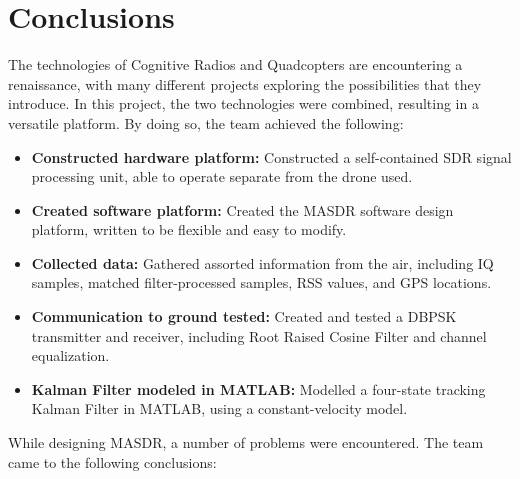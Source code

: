 \chapter{Conclusions}
The technologies of Cognitive Radios and Quadcopters are encountering a renaissance,
with many different projects exploring the possibilities that they introduce. In this project,
the two technologies were combined, resulting in a versatile platform. By doing so, 
the team achieved the following:
\begin{itemize} 
 \item \textbf{Constructed hardware platform: }Constructed a self-contained SDR signal processing
                unit, able to operate separate from the drone used.
 \item \textbf{Created software platform: }Created the MASDR software design platform,
                written to be flexible and easy to modify. 
 \item \textbf{Collected data: }Gathered assorted information from the air, including 
                IQ samples, matched filter-processed samples, RSS values, and GPS locations.
 \item \textbf{Communication to ground tested: }Created and tested a DBPSK transmitter and receiver, 
                including Root Raised Cosine Filter and channel equalization. 
 \item \textbf{Kalman Filter modeled in MATLAB: }Modelled a four-state tracking Kalman Filter
                in MATLAB, using a constant-velocity model.
\end{itemize} \par
While designing MASDR, a number of problems were encountered. The team came to the following 
conclusions:
